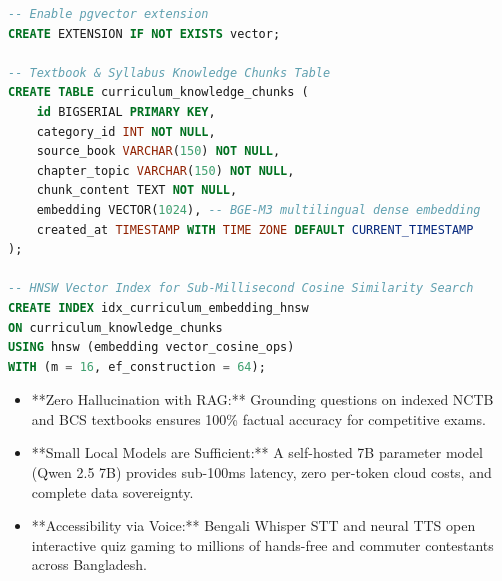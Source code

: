 \begin{lstlisting}[language=SQL, caption={PostgreSQL pgvector Schema for Trivia RAG Embeddings}]
-- Enable pgvector extension
CREATE EXTENSION IF NOT EXISTS vector;

-- Textbook & Syllabus Knowledge Chunks Table
CREATE TABLE curriculum_knowledge_chunks (
    id BIGSERIAL PRIMARY KEY,
    category_id INT NOT NULL,
    source_book VARCHAR(150) NOT NULL,
    chapter_topic VARCHAR(150) NOT NULL,
    chunk_content TEXT NOT NULL,
    embedding VECTOR(1024), -- BGE-M3 multilingual dense embedding
    created_at TIMESTAMP WITH TIME ZONE DEFAULT CURRENT_TIMESTAMP
);

-- HNSW Vector Index for Sub-Millisecond Cosine Similarity Search
CREATE INDEX idx_curriculum_embedding_hnsw 
ON curriculum_knowledge_chunks 
USING hnsw (embedding vector_cosine_ops)
WITH (m = 16, ef_construction = 64);
\end{lstlisting}

\begin{tcolorbox}[summarybox, title={Chapter Key Takeaways}]
\begin{itemize}
    \item **Zero Hallucination with RAG:** Grounding questions on indexed NCTB and BCS textbooks ensures 100\% factual accuracy for competitive exams.
    \item **Small Local Models are Sufficient:** A self-hosted 7B parameter model (Qwen 2.5 7B) provides sub-100ms latency, zero per-token cloud costs, and complete data sovereignty.
    \item **Accessibility via Voice:** Bengali Whisper STT and neural TTS open interactive quiz gaming to millions of hands-free and commuter contestants across Bangladesh.
\end{itemize}
\end{tcolorbox}
